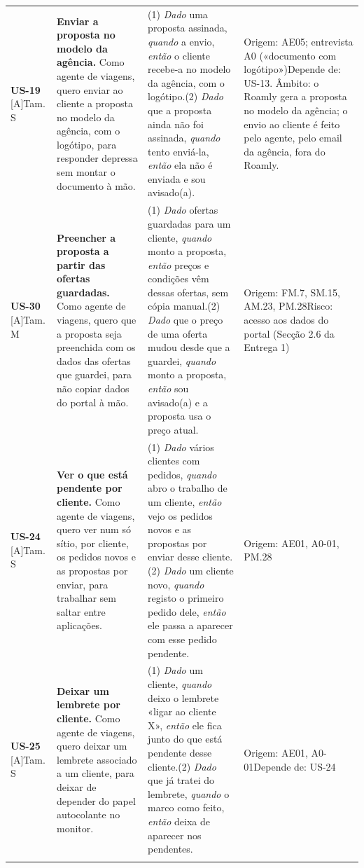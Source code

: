 {\begin{longtable}{@{}p{1.5cm}p{5.1cm}p{5.2cm}p{3.6cm}@{}}
\textbf{US-19} [A]\newline Tam. S & \textbf{Enviar a proposta no modelo da agência.} Como agente de viagens, quero enviar ao cliente a proposta no modelo da agência, com o logótipo, para responder depressa sem montar o documento à mão. & (1) \textit{Dado} uma proposta assinada, \textit{quando} a envio, \textit{então} o cliente recebe-a no modelo da agência, com o logótipo.\newline (2) \textit{Dado} que a proposta ainda não foi assinada, \textit{quando} tento enviá-la, \textit{então} ela não é enviada e sou avisado(a). & Origem: AE05; entrevista A0 («documento com logótipo»)\newline Depende de: US-13. Âmbito: o Roamly gera a proposta no modelo da agência; o envio ao cliente é feito pelo agente, pelo email da agência, fora do Roamly. \\ \addlinespace
\textbf{US-30} [A]\newline Tam. M & \textbf{Preencher a proposta a partir das ofertas guardadas.} Como agente de viagens, quero que a proposta seja preenchida com os dados das ofertas que guardei, para não copiar dados do portal à mão. & (1) \textit{Dado} ofertas guardadas para um cliente, \textit{quando} monto a proposta, \textit{então} preços e condições vêm dessas ofertas, sem cópia manual.\newline (2) \textit{Dado} que o preço de uma oferta mudou desde que a guardei, \textit{quando} monto a proposta, \textit{então} sou avisado(a) e a proposta usa o preço atual. & Origem: FM.7, SM.15, AM.23, PM.28\newline Risco: acesso aos dados do portal (Secção 2.6 da Entrega 1) \\ \addlinespace
\textbf{US-24} [A]\newline Tam. S & \textbf{Ver o que está pendente por cliente.} Como agente de viagens, quero ver num só sítio, por cliente, os pedidos novos e as propostas por enviar, para trabalhar sem saltar entre aplicações. & (1) \textit{Dado} vários clientes com pedidos, \textit{quando} abro o trabalho de um cliente, \textit{então} vejo os pedidos novos e as propostas por enviar desse cliente.\newline (2) \textit{Dado} um cliente novo, \textit{quando} registo o primeiro pedido dele, \textit{então} ele passa a aparecer com esse pedido pendente. & Origem: AE01, A0-01, PM.28 \\ \addlinespace
\textbf{US-25} [A]\newline Tam. S & \textbf{Deixar um lembrete por cliente.} Como agente de viagens, quero deixar um lembrete associado a um cliente, para deixar de depender do papel autocolante no monitor. & (1) \textit{Dado} um cliente, \textit{quando} deixo o lembrete «ligar ao cliente X», \textit{então} ele fica junto do que está pendente desse cliente.\newline (2) \textit{Dado} que já tratei do lembrete, \textit{quando} o marco como feito, \textit{então} deixa de aparecer nos pendentes. & Origem: AE01, A0-01\newline Depende de: US-24 \\ \addlinespace
\end{longtable}
}
